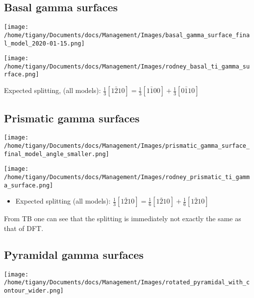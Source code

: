 \documentclass[11pt]{article}
\begin{document}
\subsection*{Basal gamma surfaces}
\label{sec:orgcc7662e}


\begin{center}
\texttt{[image: /home/tigany/Documents/docs/Management/Images/basal\_gamma\_surface\_final\_model\_2020-01-15.png]}
\label{org41bb1eb}
\end{center}


\begin{center}
\texttt{[image: /home/tigany/Documents/docs/Management/Images/rodney\_basal\_ti\_gamma\_surface.png]}
\end{center}

Expected splitting, (all models): \(\frac{1}{3}[1\bar{2}10] = \frac{1}{3}[1\bar{1}00] +  \frac{1}{3}[0\bar{1}10]\)

\subsection*{Prismatic gamma surfaces}
\label{sec:orgd54b5c5}

\begin{center}
\texttt{[image: /home/tigany/Documents/docs/Management/Images/prismatic\_gamma\_surface\_final\_model\_angle\_smaller.png]}
\end{center}


\begin{center}
\texttt{[image: /home/tigany/Documents/docs/Management/Images/rodney\_prismatic\_ti\_gamma\_surface.png]}
\end{center}


\begin{itemize}
\item Expected splitting (all models): \(\frac{1}{3}[1\bar{2}10] = \frac{1}{6}[1\bar{2}10] + \frac{1}{6}[1\bar{2}10]\)
\end{itemize}

\begin{NOTES}


From TB one can see that the splitting is immediately not exactly the same as
that of DFT. 
\end{NOTES}

\subsection*{Pyramidal gamma surfaces}
\label{sec:org4f6e69f}
\begin{center}
\texttt{[image: /home/tigany/Documents/docs/Management/Images/rotated\_pyramidal\_with\_contour\_wider.png]}
\label{org657187c}
\end{center}
\end{document}
